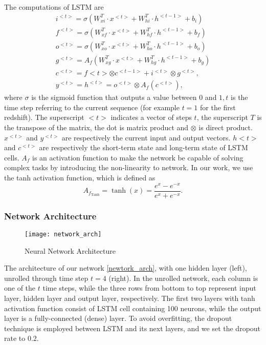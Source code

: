 The computations of LSTM are
\begin{align}
i^{<t>}=\sigma\left(W_{x i}^{T} \cdot x^{<t>}+W_{h i}^{T} \cdot h^{<t-1>}+b_{i}\right) \\
f^{<t>}=\sigma\left(W_{x f}^{T} \cdot x^{<t>}+W_{h f}^{T} \cdot h^{<t-1>}+b_{f}\right) \\
o^{<t>}=\sigma\left(W_{x o}^{T} \cdot x^{<t>}+W_{h o}^{T} \cdot h^{<t-1>}+b_{o}\right) \\
g^{<t>}=A_{f}\left(W_{x g}^{T} \cdot x^{<t>}+W_{h g}^{T} \cdot h^{<t-1>}+b_{g}\right) \\
c^{<t>}=f<t>\otimes c^{<t-1>}+i^{<t>} \otimes g^{<t>}, \\
y^{<t>}=h^{<t>}=o^{<t>} \otimes A_{f}\left(c^{<t>}\right),
\end{align}
where $\sigma$ is the sigmoid function that outputs a value between 0 and $1, t$ is the time step referring to the current sequence (for example $t=1$ for the first redshift). The superscript $<t>$ indicates a vector of steps $t$, the superscript $T$ is the transpose of the matrix, the dot is matrix product and $\otimes$ is direct product. $x^{<t>}$ and $y^{<t>}$ are respectively the current input and output vectors. $h<t>$ and $c^{<t>}$ are respectively the short-term state and long-term state of LSTM cells. $A_{f}$ is an activation function to make the network be capable of solving complex tasks by introducing the non-linearity to network. In our work, we use the tanh activation function, which is defined as
$$
A_{f_{\operatorname{Tanh}}}=\tanh (x)=\frac{e^{x}-e^{-x}}{e^{x}+e^{-x}} .
$$

\subsubsection{Network Architecture}
\begin{figure} [H]
	\centering
	\texttt{[image: network\_arch]}
	\caption{Neural Network Architecture}
	\label{newtork_arch}
\end{figure}

The architecture of our network \eqref{newtork_arch}, with one hidden layer (left), unrolled through time step $t=4$ (right). In the unrolled network, each column is one of the $t$ time steps, while the three rows from bottom to top represent input layer, hidden layer and output layer, respectively. The first two layers with tanh activation function consist of LSTM cell containing 100 neurons, while the output layer is a fully-connected (dense) layer. To avoid overfitting, the dropout\cite{srivastava2014dropout} technique is employed between LSTM and its next layers, and we set the dropout rate to $0.2$.


